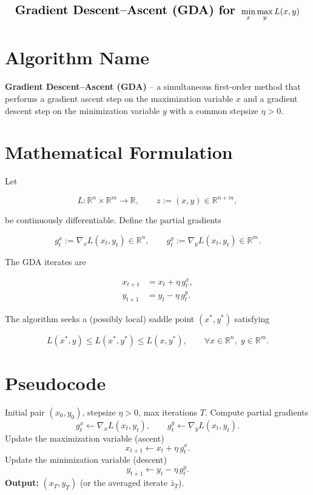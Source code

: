 \[
\text{\Large\bf Gradient Descent–Ascent (GDA) for }\displaystyle\min_{x}\max_{y}L(x,y)
\]

\section*{Algorithm Name}
\textbf{Gradient Descent–Ascent (GDA)} – a simultaneous first‑order method that performs a gradient ascent step on the maximization variable \(x\) and a gradient descent step on the minimization variable \(y\) with a common stepsize \(\eta>0\).

\section*{Mathematical Formulation}
Let  

\[
L:\mathbb R^{n}\times\mathbb R^{m}\rightarrow\mathbb R ,\qquad
z:=(x,y)\in\mathbb R^{n+m},
\]

be continuously differentiable.  
Define the partial gradients  

\[
g^{x}_{t}:=\nabla_{x}L(x_{t},y_{t})\in\mathbb R^{n},
\qquad 
g^{y}_{t}:=\nabla_{y}L(x_{t},y_{t})\in\mathbb R^{m}.
\]

The GDA iterates are  

\[
\boxed{
\begin{aligned}
x_{t+1}&=x_{t}+\eta\,g^{x}_{t},\\[2mm]
y_{t+1}&=y_{t}-\eta\,g^{y}_{t}.
\end{aligned}}
\tag{1}
\]

The algorithm seeks a (possibly local) saddle point \((x^{*},y^{*})\) satisfying  

\[
L(x^{*},y)\le L(x^{*},y^{*})\le L(x,y^{*}),
\qquad\forall x\in\mathbb R^{n},\;y\in\mathbb R^{m}.
\]

\section*{Pseudocode}
\begin{algorithm}[H]
\caption{Gradient Descent–Ascent (GDA)}
\begin{algorithmic}[1]
\Require Initial pair \((x_{0},y_{0})\), stepsize \(\eta>0\), max iterations \(T\).
    \State Compute partial gradients  
    \[
    g^{x}_{t}\gets\nabla_{x}L(x_{t},y_{t}),\qquad 
    g^{y}_{t}\gets\nabla_{y}L(x_{t},y_{t}).
    \]
    \State Update the maximization variable (ascent)  
    \[
    x_{t+1}\gets x_{t}+\eta\,g^{x}_{t}.
    \]
    \State Update the minimization variable (descent)  
    \[
    y_{t+1}\gets y_{t}-\eta\,g^{y}_{t}.
    \]
\EndFor
\State \textbf{Output:} \((x_{T},y_{T})\) (or the averaged iterate \(\bar z_T\)).
\end{algorithmic}
\end{algorithm}


